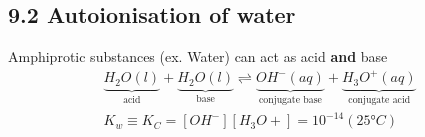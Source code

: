\subsection{9.2 Autoionisation of water}
    Amphiprotic substances (ex. Water) can act as acid \textbf{and} base
    \begin{gather*}
        \underbrace{H_2O(l)}_\text{acid} + \underbrace{H_2O(l)}_\text{base} \rightleftharpoons \underbrace{OH^- (aq)}_\text{conjugate base} + \underbrace{H_3O^+ (aq)}_\text{conjugate acid}\\
        K_w \equiv K_C = [OH^-][H_3O+] = 10^{-14} (25\textrm{°}C)
    \end{gather*}
    